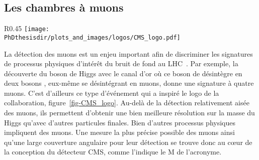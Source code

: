 \subsection{Les chambres à muons}\label{chapter-LHC-section-CMS-subsec-muons}
\begin{wrapfigure}{R}{0.45\textwidth}
\centering
\texttt{[image: \\PhDthesisdir/plots\_and\_images/logos/CMS\_logo.pdf]}
\caption[Le logo de la collaboration CMS.]{Le logo de la collaboration CMS. Il représente, plié en quatre, un événement $\Higgs\to4\mu$ dans le plan transverse du détecteur.}
\label{fig-CMS_logo}
\end{wrapfigure}
La détection des muons est un enjeu important afin de discriminer les signatures de processus physiques d'intérêt du bruit de fond au LHC~\cite{cms_paper}.
Par exemple, la découverte du boson de Higgs avec le \og canal d'or \fg{} où ce boson de désintègre en deux bosons \Zboson, eux-même se désintégrant en muons, donne une signature à quatre muons.
C'est d'ailleurs ce type d'événement qui a inspiré le logo de la collaboration, figure~\ref{fig-CMS_logo}.
Au-delà de la détection relativement aisée des muons, ils permettent d'obtenir une bien meilleure résolution sur la masse du Higgs qu'avec d'autres particules finales.
Bien d'autres processus physiques impliquent des muons.
Une mesure la plus précise possible des muons ainsi qu'une large couverture angulaire pour leur détection se trouve donc au cœur de la conception du détecteur CMS, comme l'indique le \og M \fg{} de l'acronyme.
%
%
%
%
%
